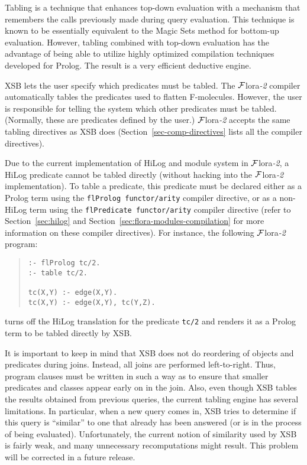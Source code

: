 \documentclass[11pt]{article}
\newcommand{\FLORA}{{\mbox{${\cal F}${\sc lora}\rm\emph{-2}}}\xspace}
\begin{document}
%
Tabling is a technique that enhances top-down evaluation with a mechanism
that remembers the calls previously made during query evaluation.
This technique is known to be essentially equivalent to the Magic Sets
method for bottom-up evaluation. However, tabling combined with top-down
evaluation has the advantage of being able to utilize highly optimized
compilation techniques developed for Prolog. The result is a very efficient
deductive engine.

XSB lets the user specify which predicates must be tabled.  The \FLORA
compiler automatically tables the predicates used to flatten F-molecules.
However, the user is responsible for telling the system which other
predicates must be tabled. (Normally, these are predicates defined by the
user.)  \FLORA accepts the same tabling directives as XSB does
(Section~\ref{sec-comp-directives} lists all the compiler directives).

%
Due to the current implementation of HiLog and module system in \FLORA,
a HiLog predicate cannot be tabled directly (without hacking into the
\FLORA implementation). To table a predicate, this predicate must be
declared either as a Prolog term using the \mbox{\tt flProlog functor/arity}
compiler directive, or as a non-HiLog term using the
\mbox{\tt flPredicate functor/arity} compiler directive (refer to
Section~\ref{sec:hilog} and Section~\ref{sec:flora-modules-compilation}
for more information on these compiler directives). For instance,
the following \FLORA program:
\begin{quote}
\begin{verbatim}
:- flProlog tc/2.
:- table tc/2.

tc(X,Y) :- edge(X,Y).
tc(X,Y) :- edge(X,Y), tc(Y,Z).
\end{verbatim}
\end{quote}
turns off the HiLog translation for the predicate {\tt tc/2} and
renders it as a Prolog term to be tabled directly by XSB.

It is important to keep in mind that XSB does not do reordering of
objects and predicates during joins. Instead, all joins are performed
left-to-right.  Thus, program clauses must be written in such a way as
to ensure that smaller predicates and classes appear early on in the
join. Also, even though XSB tables the results obtained from previous
queries, the current tabling engine has several limitations. In
particular, when a new query comes in, XSB tries to determine if this
query is ``similar'' to one that already has been answered (or is in
the process of being evaluated).  Unfortunately, the current notion of
similarity used by XSB is fairly weak, and many unnecessary
recomputations might result. This problem will be corrected in a
future release.
\end{document}
